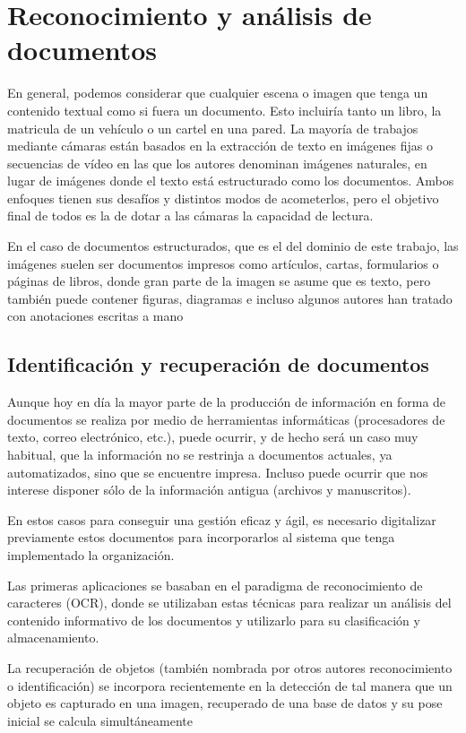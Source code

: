  \section{Reconocimiento y análisis de documentos}

   En general, podemos considerar que cualquier escena o imagen que tenga un contenido textual como si fuera un documento. Esto incluiría tanto un libro, la matricula de un vehículo o un cartel en una pared. La mayoría de trabajos mediante cámaras están basados en la extracción de texto en imágenes fijas o secuencias de vídeo en las que los autores denominan imágenes naturales, en lugar de imágenes donde el texto está estructurado como los documentos. Ambos enfoques tienen sus desafíos y distintos modos de acometerlos, pero el objetivo final de todos es la de dotar a las cámaras la capacidad de lectura.

  En el caso de documentos estructurados, que es el del dominio de este trabajo, las imágenes suelen ser documentos impresos como artículos, cartas, formularios o páginas de libros, donde gran parte de la imagen se asume que es texto, pero también puede contener figuras, diagramas e incluso algunos autores han tratado con anotaciones escritas a mano \cite{Chen}

  \subsection{Identificación y recuperación de documentos}
  Aunque hoy en día la mayor parte de la producción de información en forma de documentos se realiza por medio de herramientas informáticas (procesadores de texto, correo electrónico, etc.), puede ocurrir, y de hecho será un caso muy habitual, que la información no se restrinja a documentos actuales, ya automatizados, sino que se encuentre impresa. Incluso puede ocurrir que nos interese disponer sólo de la información antigua (archivos y manuscritos).

  En estos casos para conseguir una gestión eficaz y ágil, es necesario digitalizar previamente estos documentos para incorporarlos al sistema que tenga implementado la organización.

  Las primeras aplicaciones se basaban en el paradigma de reconocimiento de caracteres (OCR), donde se utilizaban estas técnicas para realizar un análisis del contenido informativo de los documentos y utilizarlo para su clasificación y almacenamiento. 

  La recuperación de objetos (también nombrada por otros autores reconocimiento o identificación) se incorpora recientemente en la detección de tal manera que un objeto es capturado en una imagen, recuperado de una base de datos y su pose inicial se calcula simultáneamente \cite{Pilet}

